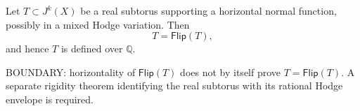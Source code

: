 \begin{conjecture}
Let $T \subset J^k(X)$ be a real subtorus supporting a horizontal normal function,
possibly in a mixed Hodge variation.
Then
\[
T = \mathsf{Flip}(T),
\]
and hence $T$ is defined over $\mathbb{Q}$.
\end{conjecture}

\noindent
BOUNDARY: horizontality of $\mathsf{Flip}(T)$ does not by itself prove
$T=\mathsf{Flip}(T)$.  A separate rigidity theorem identifying the real
subtorus with its rational Hodge envelope is required.

